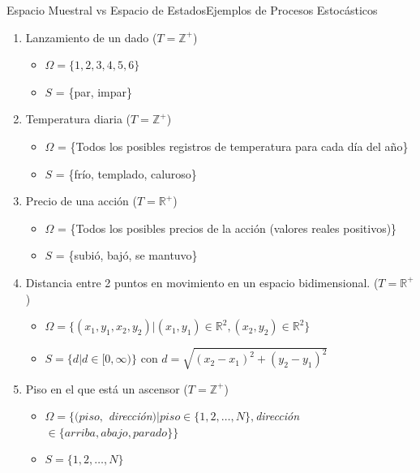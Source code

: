 \documentclass[10pt, envcountsect, handout, aspectratio=1610, hyperref={hypertexnames=true}]{beamer}
\begin{document}
 

\begin{frame}{Espacio Muestral vs Espacio de Estados}{Ejemplos de Procesos Estocásticos}

\begin{examples}
    \begin{enumerate}
        \item Lanzamiento de un dado ($T=\mathbb{Z}^+$)
        \begin{itemize}
        \item $\Omega = \{1, 2, 3, 4, 5, 6\}$  
        \item $S$ = \{par, impar\}
        \end{itemize}
        
        \item Temperatura diaria ($T=\mathbb{Z}^+$)
        \begin{itemize}
        \item $\Omega$ = \{Todos los posibles registros de temperatura para cada día del año\}
        \item $S$ = \{frío, templado, caluroso\}
        \end{itemize}
        
        \item Precio de una acción ($T=\mathbb{R}^+$)
        \begin{itemize}
        \item $\Omega$ = \{Todos los posibles precios de la acción (valores reales positivos)\}
		\item $S$ = \{subió, bajó, se mantuvo\}
		\end{itemize}
		
		\item Distancia entre 2 puntos en movimiento en un espacio bidimensional. ($T=\mathbb{R}^+$)
        \begin{itemize}
        \item $\Omega = \{(x_1, y_1, x_2, y_2) | (x_1, y_1)\in \mathbb{R}^2, (x_2, y_2)\in \mathbb{R}^2\}$
		\item $S = \{d| d\in[0,\infty)\}$ con $d=\sqrt{(x_2-x_1)^2+(y_2-y_1)^2}$
		\end{itemize}
		
		\item Piso en el que está un ascensor ($T=\mathbb{Z}^+$)
        \begin{itemize}
        \item $\Omega = \{(piso,$ \textit{\color{blue}dirección}$) | piso\in \{1, 2, \ldots, N\}, $\textit{\color{blue}dirección}$\in \{arriba, abajo, parado\}\}$
		\item $S = \{1, 2, \ldots, N\}$
		\end{itemize}	
				
    \end{enumerate}
\end{examples}
\end{frame}
\end{document}
